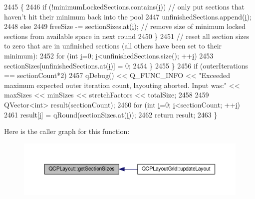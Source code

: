 \begin{DoxyCode}
2445       \{
2446         \textcolor{keywordflow}{if} (!minimumLockedSections.contains(\hyperlink{_comparision_pictures_2_createtest_image_8m_a6f6ccfcf58b31cb6412107d9d5281426}{i})) \textcolor{comment}{// only put sections that haven't hit their minimum back
       into the pool}
2447           unfinishedSections.append(\hyperlink{_comparision_pictures_2_createtest_image_8m_a6f6ccfcf58b31cb6412107d9d5281426}{i});
2448         \textcolor{keywordflow}{else}
2449           freeSize -= sectionSizes.at(\hyperlink{_comparision_pictures_2_createtest_image_8m_a6f6ccfcf58b31cb6412107d9d5281426}{i}); \textcolor{comment}{// remove size of minimum locked sections from available space
       in next round}
2450       \}
2451       \textcolor{comment}{// reset all section sizes to zero that are in unfinished sections (all others have been set to their
       minimum):}
2452       \textcolor{keywordflow}{for} (\textcolor{keywordtype}{int} \hyperlink{_comparision_pictures_2_createtest_image_8m_a6f6ccfcf58b31cb6412107d9d5281426}{i}=0; \hyperlink{_comparision_pictures_2_createtest_image_8m_a6f6ccfcf58b31cb6412107d9d5281426}{i}<unfinishedSections.size(); ++\hyperlink{_comparision_pictures_2_createtest_image_8m_a6f6ccfcf58b31cb6412107d9d5281426}{i})
2453         sectionSizes[unfinishedSections.at(\hyperlink{_comparision_pictures_2_createtest_image_8m_a6f6ccfcf58b31cb6412107d9d5281426}{i})] = 0;
2454     \}
2455   \}
2456   \textcolor{keywordflow}{if} (outerIterations == sectionCount*2)
2457     qDebug() << Q\_FUNC\_INFO << \textcolor{stringliteral}{"Exceeded maximum expected outer iteration count, layouting aborted. Input
       was:"} << maxSizes << minSizes << stretchFactors << totalSize;
2458   
2459   QVector<int> result(sectionCount);
2460   \textcolor{keywordflow}{for} (\textcolor{keywordtype}{int} \hyperlink{_comparision_pictures_2_createtest_image_8m_a6f6ccfcf58b31cb6412107d9d5281426}{i}=0; \hyperlink{_comparision_pictures_2_createtest_image_8m_a6f6ccfcf58b31cb6412107d9d5281426}{i}<sectionCount; ++\hyperlink{_comparision_pictures_2_createtest_image_8m_a6f6ccfcf58b31cb6412107d9d5281426}{i})
2461     result[\hyperlink{_comparision_pictures_2_createtest_image_8m_a6f6ccfcf58b31cb6412107d9d5281426}{i}] = qRound(sectionSizes.at(\hyperlink{_comparision_pictures_2_createtest_image_8m_a6f6ccfcf58b31cb6412107d9d5281426}{i}));
2462   \textcolor{keywordflow}{return} result;
2463 \}
\end{DoxyCode}


Here is the caller graph for this function\+:\nopagebreak
\begin{figure}[H]
\begin{center}
\leavevmode
\includegraphics[width=350pt]{class_q_c_p_layout_a92d9dcd95e9510b323706ef7fc4ff62e_icgraph}
\end{center}
\end{figure}


